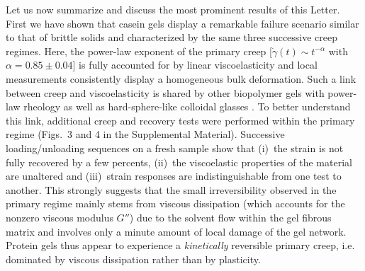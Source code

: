 \documentclass[twocolumn,superscriptaddress,showpacs,preprintnumbers,amsmath,amssymb,prl]{revtex4}
\newcommand\gp{\dot\gamma}
\begin{document}
Let us now summarize and discuss the most prominent results of this Letter. First we have shown that casein gels display a remarkable failure scenario similar to that of brittle solids and characterized by the same three successive creep regimes. Here, the power-law exponent of the primary creep [$\gp(t)\sim t^{-\alpha}$ with $\alpha=0.85\pm 0.04$] is fully accounted for by linear viscoelasticity and local measurements consistently display a homogeneous bulk deformation. Such a link between creep and viscoelasticity is shared by other biopolymer gels with power-law rheology \cite{Gobeaux:2010,Jaishankar:2013} as well as hard-sphere-like colloidal glasses \cite{Siebenburger:2012}. To better understand this link, additional creep and recovery tests were performed within the primary regime (Figs.~3 and 4 in the Supplemental Material). Successive loading/unloading sequences on a fresh sample show that (i)~the strain is not fully recovered by a few percents, (ii)~the viscoelastic properties of the material are unaltered and (iii)~strain responses are indistinguishable from one test to another. This strongly suggests that the small irreversibility observed in the primary regime mainly stems from viscous dissipation (which accounts for the nonzero viscous modulus $G''$) due to the solvent flow within the gel fibrous matrix and involves only a minute amount of local damage of the gel network. Protein gels thus appear to experience a {\it kinetically} reversible primary creep, i.e. dominated by viscous dissipation rather than by plasticity.
\end{document}
